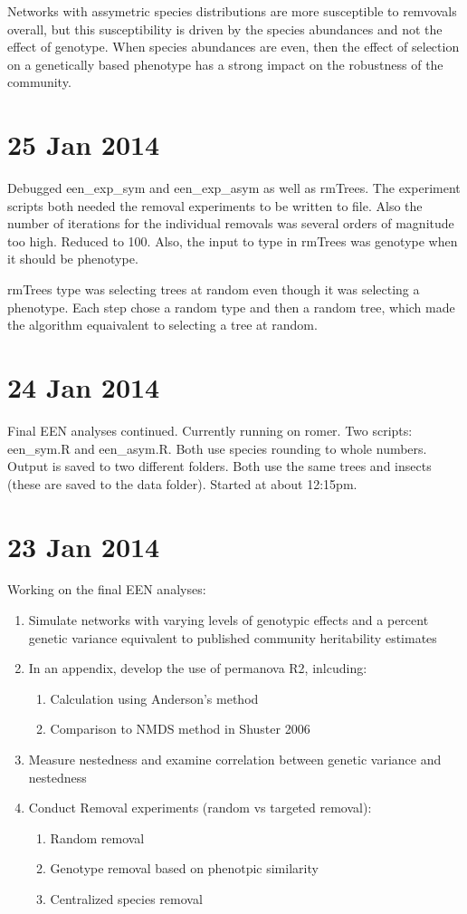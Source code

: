 \documentclass[12pt]{article}
\begin{document}
Networks with assymetric species distributions are more susceptible to
remvovals overall, but this susceptibility is driven by the species abundances
and not the effect of genotype. When species abundances are even, then
the effect of selection on a genetically based phenotype has a strong
impact on the robustness of the community.

\section{25 Jan 2014}

Debugged een_exp_sym and een_exp_asym as well as rmTrees. The
experiment scripts both needed the removal experiments to be written
to file. Also the number of iterations for the individual removals was
several orders of magnitude too high. Reduced to 100. Also, the input
to type in rmTrees was genotype when it should be phenotype.

rmTrees type was selecting trees at random even though it was
selecting a phenotype. Each step chose a random type and then a random
tree, which made the algorithm equaivalent to selecting a tree at
random. 

\section{24 Jan 2014}

Final EEN analyses continued. Currently running on romer. Two scripts:
een_sym.R and een_asym.R. Both use species rounding to whole
numbers. Output is saved to two different folders. Both use the same
trees and insects (these are saved to the data folder). Started at
about 12:15pm.

\section{23 Jan 2014}
Working on the final EEN analyses:

\begin{enumerate}
\item Simulate networks with varying levels of genotypic effects and a
  percent genetic variance equivalent to published community
  heritability estimates
\item In an appendix, develop the use of permanova R2, inlcuding:
  \begin{enumerate}
  \item Calculation using Anderson's method
  \item Comparison to NMDS method in Shuster 2006
  \end{enumerate}
\item Measure nestedness and examine correlation between genetic
  variance and nestedness
\item Conduct Removal experiments (random vs targeted removal):
  \begin{enumerate}
  \item Random removal
  \item Genotype removal based on phenotpic similarity
  \item Centralized species removal
  \end{enumerate}
\end{enumerate}
\end{document}
